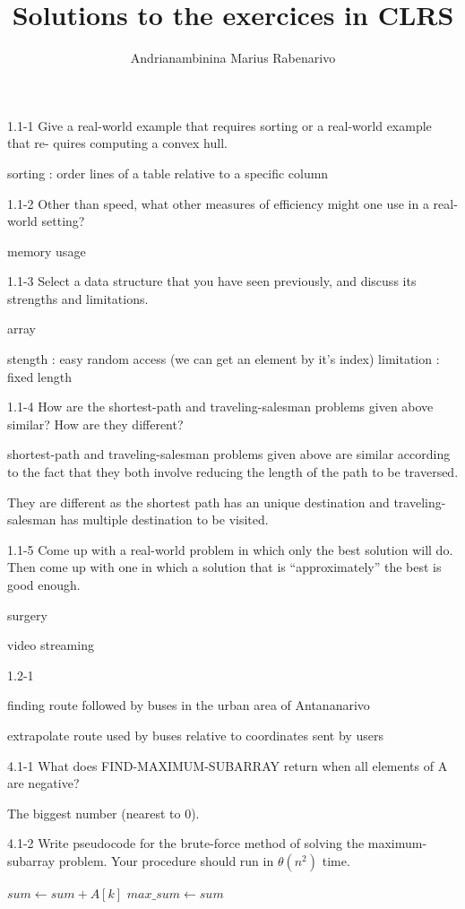\documentclass{article}
\title{Solutions to the exercices in CLRS}
\author{Andrianambinina Marius Rabenarivo}
\begin{document}
\maketitle

1.1-1
Give a real-world example that requires sorting or a real-world example that re-
quires computing a convex hull.

sorting : order lines of a table relative to a specific column

1.1-2
Other than speed, what other measures of efficiency might one use in a real-world setting?

memory usage

1.1-3
Select a data structure that you have seen previously, and discuss its strengths and limitations.

array

stength : easy random access (we can get an element by it's index)
limitation : fixed length

1.1-4
How are the shortest-path and traveling-salesman problems given above similar?
How are they different?

shortest-path and traveling-salesman problems given above are similar
according to the fact that they both involve reducing the length of
the path to be traversed.

They are different as the shortest path has an unique destination
and traveling-salesman has multiple destination to be visited.

1.1-5
Come up with a real-world problem in which only the best solution will do. Then
come up with one in which a solution that is “approximately” the best is good
enough.

surgery

video streaming


1.2-1

finding route followed by buses in the urban area of Antananarivo

extrapolate route used by buses relative to coordinates sent by users


4.1-1
What does FIND-MAXIMUM-SUBARRAY return when all elements of A are negative?

The biggest number (nearest to 0).

4.1-2
Write pseudocode for the brute-force method of solving the maximum-subarray
problem. Your procedure should run in $\theta(n^2)$ time.

\begin{algorithm}
  \begin{algorithmic}
            \State $sum \gets sum + A[k]$
          \EndFor
            \State $max\_sum \gets sum$
          \EndIf
        \EndFor
      \EndFor
    \EndProcedure
  \end{algorithmic}
\end{algorithm}
\end{document}
